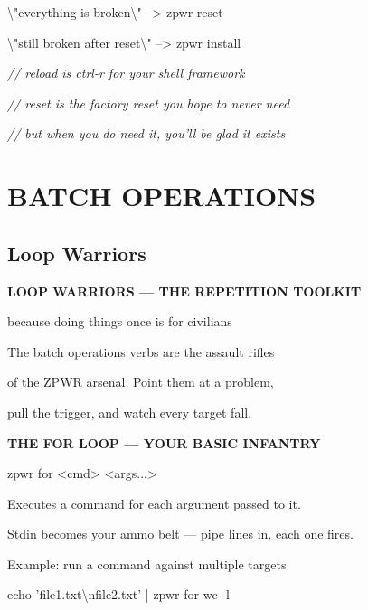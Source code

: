 \documentclass[11pt,a4paper,twoside]{book}
\begin{document}
\textbackslash{}"everything is broken\textbackslash{}"     --> zpwr reset

\textbackslash{}"still broken after reset\textbackslash{}" --> zpwr install

{\small\itshape\color{dimtext} // reload is ctrl-r for your shell framework}

{\small\itshape\color{dimtext} // reset is the factory reset you hope to never need}

{\small\itshape\color{dimtext} // but when you do need it, you'll be glad it exists}


\vspace{16pt}


\chapter{BATCH OPERATIONS}

\section{Loop Warriors}


\vspace{10pt}
{\large\bfseries\color{neoncyan} LOOP WARRIORS — THE REPETITION TOOLKIT}\vspace{6pt}

because doing things once is for civilians

The batch operations verbs are the assault rifles

of the ZPWR arsenal. Point them at a problem,

pull the trigger, and watch every target fall.


\vspace{12pt}
{\bfseries\color{neonyellow} THE FOR LOOP — YOUR BASIC INFANTRY}\vspace{4pt}

\begin{codebox}
zpwr for <cmd> <args...>\\
\end{codebox}

Executes a command for each argument passed to it.

Stdin becomes your ammo belt — pipe lines in, each one fires.

Example: run a command against multiple targets

\begin{codebox}
echo 'file1.txt\textbackslash{}nfile2.txt' | zpwr for wc -l\\
\end{codebox}
\end{document}
